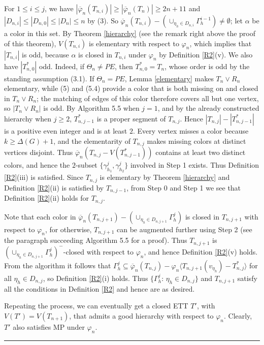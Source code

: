 \documentclass[11pt]{article}
\newcommand{\phibar}{\overline{\varphi}}
\def\qed{\hfill \rule{4pt}{7pt}}
\begin{document}
For $1\le i \le j$, we have $|\phibar_n(T_{n,i})|\ge |\phibar_n(T_{n})|\ge 2n+11$ and $|D_{n,i}| 
\le |D_{n,0}|\le |D_n|\le n$  by (3). So $\phibar_n(T_{n,i})-(\cup_{\eta_h\in D_{n,i}}\Gamma^{i-1}_h) \ne \emptyset$; 
let $\alpha$ be a color in this set. By Theorem \ref{hierarchy} (see the remark right above the proof of this theorem), 
$V(T_{n,i})$ is elementary with respect to $\varphi_n$, which implies that $|T_{n,i}|$ is odd, because $\alpha$ is closed 
in $T_{n,i}$ under $\varphi_n$ by Definition \ref{R2}(v). We also have $|T_{n,0}^*|$ odd. Indeed, if
$\Theta_n\ne PE$, then $T_{n,0}^*=T_n$, whose order is odd by the standing assumption (3.1). If
$\Theta_n=PE$, Lemma \ref{elementary} makes $T_n\vee R_n$ elementary, while (5) and (5.4) provide a color
that is both missing on and closed in $T_n\vee R_n$; the matching of edges of this color therefore covers all
but one vertex, so $|T_n\vee R_n|$ is odd. By Algorithm 5.5 when $j=1$, and by the already constructed hierarchy
when $j\ge 2$, $T_{n,j-1}^*$ is a proper segment of $T_{n,j}$. Hence
$|T_{n,j}|-|T_{n,j-1}^*|$ is a positive even integer and is at least $2$. Every vertex misses a color because
$k\ge\Delta(G)+1$, and the elementarity of $T_{n,j}$ makes missing colors at distinct vertices disjoint. Thus
$\phibar_n(T_{n,j}-V(T_{n,j-1}^*))$ contains at least two distinct colors, and hence the $2$-subset
$\{\gamma^{j}_{h_1},\gamma^{j}_{h_2}\}$ involved in Step 1 exists. Thus Definition \ref{R2}(iii) is satisfied.
Since $T_{n,j}$ is elementary by Theorem \ref{hierarchy} and Definition \ref{R2}(ii) is satisfied by
$T_{n,j-1}$, from Step 0 and Step 1 we see that Definition \ref{R2}(ii) holds for $T_{n,j}$.

Note that each color in $\phibar_n(T_{n,j+1})-(\cup_{\eta_h\in D_{n,j+1}}\Gamma^{j}_h)$ is closed in $T_{n,j+1}$ with respect to $\varphi_n$, for otherwise, 
$T_{n,j+1}$ can be augmented further using Step 2 (see the paragraph succeeding Algorithm 5.5 for a proof). Thus $T_{n,j+1}$ is $(\cup_{\eta_h\in D_{n,j+1}}\Gamma^{j}_h)^-$-closed with respect to $\varphi_n$, and hence Definition \ref{R2}(v) holds. From the algorithm it follows that $\Gamma^{j}_h \subseteq \phibar_n(T_{n,j})-\varphi_n \langle T_{n,j+1}(v_{\eta_h})-T_{n,j}^* \rangle$ for all $\eta_h\in D_{n,j}$, so Definition \ref{R2}(i) holds. Thus 
$\{\Gamma^{j}_h:\, \eta_h\in D_{n,j}\}$ and $T_{n,j+1}$ satisfy all the conditions in Definition \ref{R2} and hence are as desired.

Repeating the process, we can eventually get a closed ETT $T'$, with $V(T')=V(T_{n+1})$, that admits a good hierarchy
with respect to $\varphi_n$. Clearly, $T'$ also satisfies MP under $\varphi_n$.  \qed \\
\end{document}
